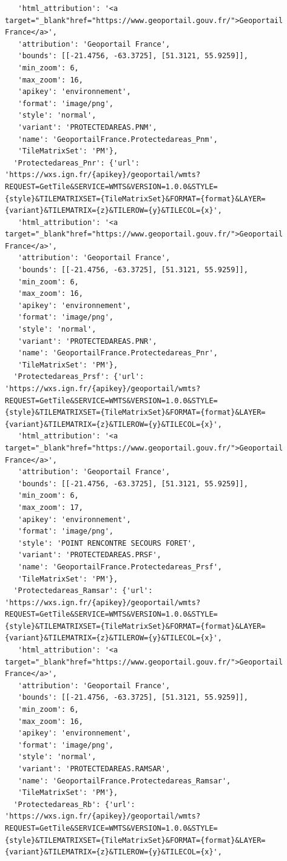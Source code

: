 \documentclass[
  letterpaper,
  DIV=11,
  numbers=noendperiod]{scrreprt}
\begin{document}
\begin{verbatim}
   'html_attribution': '<a target="_blank"href="https://www.geoportail.gouv.fr/">Geoportail France</a>',
   'attribution': 'Geoportail France',
   'bounds': [[-21.4756, -63.3725], [51.3121, 55.9259]],
   'min_zoom': 6,
   'max_zoom': 16,
   'apikey': 'environnement',
   'format': 'image/png',
   'style': 'normal',
   'variant': 'PROTECTEDAREAS.PNM',
   'name': 'GeoportailFrance.Protectedareas_Pnm',
   'TileMatrixSet': 'PM'},
  'Protectedareas_Pnr': {'url': 'https://wxs.ign.fr/{apikey}/geoportail/wmts?REQUEST=GetTile&SERVICE=WMTS&VERSION=1.0.0&STYLE={style}&TILEMATRIXSET={TileMatrixSet}&FORMAT={format}&LAYER={variant}&TILEMATRIX={z}&TILEROW={y}&TILECOL={x}',
   'html_attribution': '<a target="_blank"href="https://www.geoportail.gouv.fr/">Geoportail France</a>',
   'attribution': 'Geoportail France',
   'bounds': [[-21.4756, -63.3725], [51.3121, 55.9259]],
   'min_zoom': 6,
   'max_zoom': 16,
   'apikey': 'environnement',
   'format': 'image/png',
   'style': 'normal',
   'variant': 'PROTECTEDAREAS.PNR',
   'name': 'GeoportailFrance.Protectedareas_Pnr',
   'TileMatrixSet': 'PM'},
  'Protectedareas_Prsf': {'url': 'https://wxs.ign.fr/{apikey}/geoportail/wmts?REQUEST=GetTile&SERVICE=WMTS&VERSION=1.0.0&STYLE={style}&TILEMATRIXSET={TileMatrixSet}&FORMAT={format}&LAYER={variant}&TILEMATRIX={z}&TILEROW={y}&TILECOL={x}',
   'html_attribution': '<a target="_blank"href="https://www.geoportail.gouv.fr/">Geoportail France</a>',
   'attribution': 'Geoportail France',
   'bounds': [[-21.4756, -63.3725], [51.3121, 55.9259]],
   'min_zoom': 6,
   'max_zoom': 17,
   'apikey': 'environnement',
   'format': 'image/png',
   'style': 'POINT RENCONTRE SECOURS FORET',
   'variant': 'PROTECTEDAREAS.PRSF',
   'name': 'GeoportailFrance.Protectedareas_Prsf',
   'TileMatrixSet': 'PM'},
  'Protectedareas_Ramsar': {'url': 'https://wxs.ign.fr/{apikey}/geoportail/wmts?REQUEST=GetTile&SERVICE=WMTS&VERSION=1.0.0&STYLE={style}&TILEMATRIXSET={TileMatrixSet}&FORMAT={format}&LAYER={variant}&TILEMATRIX={z}&TILEROW={y}&TILECOL={x}',
   'html_attribution': '<a target="_blank"href="https://www.geoportail.gouv.fr/">Geoportail France</a>',
   'attribution': 'Geoportail France',
   'bounds': [[-21.4756, -63.3725], [51.3121, 55.9259]],
   'min_zoom': 6,
   'max_zoom': 16,
   'apikey': 'environnement',
   'format': 'image/png',
   'style': 'normal',
   'variant': 'PROTECTEDAREAS.RAMSAR',
   'name': 'GeoportailFrance.Protectedareas_Ramsar',
   'TileMatrixSet': 'PM'},
  'Protectedareas_Rb': {'url': 'https://wxs.ign.fr/{apikey}/geoportail/wmts?REQUEST=GetTile&SERVICE=WMTS&VERSION=1.0.0&STYLE={style}&TILEMATRIXSET={TileMatrixSet}&FORMAT={format}&LAYER={variant}&TILEMATRIX={z}&TILEROW={y}&TILECOL={x}',

\end{verbatim}
\end{document}
